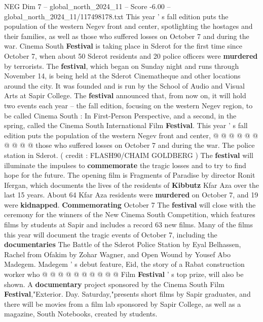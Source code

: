 \begin{textsample}{NEG Dim 7 – global\_north\_2024\_11 – Score -6.00 – global\_north\_2024\_11/117498178.txt}  \label{ex:f7_neg_257}
This year ' s fall edition puts the population of the western Negev front and center, spotlighting the hostages and their families, as well as those who suffered losses on October 7 and during the war.
Cinema South \textbf{Festival} is taking place in Sderot for the first time since October 7, when about 50 Sderot residents and 20 police officers were \textbf{murdered} by terrorists.
The \textbf{festival}, which began on Sunday night and runs through November 14, is being held at the Sderot Cinematheque and other locations around the city.
It was founded and is run by the School of Audio and Visual Arts at Sapir College.
The \textbf{festival} announced that, from now on, it will hold two events each year -- the fall edition, focusing on the western Negev region, to be called Cinema South : In First-Person Perspective, and a second, in the spring, called the Cinema South International Film \textbf{Festival}.
This year ' s fall edition puts the population of the western Negev front and center, @ @ @ @ @ @ @ @ @ @ those who suffered losses on October 7 and during the war.
The police station in Sderot. ( credit : FLASH90/CHAIM GOLDBERG ) The \textbf{festival} will illuminate the impulses to \textbf{commemorate} the tragic losses and to try to find hope for the future.
The opening film is Fragments of Paradise by director Ronit Ifergan, which documents the lives of the residents of \textbf{Kibbutz} Kfar Aza over the last 15 years.
About 64 Kfar Aza residents were \textbf{murdered} on October 7, and 19 were \textbf{kidnapped}. \textbf{Commemorating} October 7 The \textbf{festival} will close with the ceremony for the winners of the New Cinema South Competition, which features films by students at Sapir and includes a record 63 new films.
Many of the films this year will document the tragic events of October 7, including the \textbf{documentaries} The Battle of the Sderot Police Station by Eyal Belhassen, Rachel from Ofakim by Zohar Wagner, and Open Wound by Yousef Abo Madegem.
Madegem ' s debut feature, Eid, the story of a Rabat construction worker who @ @ @ @ @ @ @ @ @ @ Film \textbf{Festival} ' s top prize, will also be shown.
A \textbf{documentary} project sponsored by the Cinema South Film \textbf{Festival},"Exterior.
Day.
Saturday,"presents short films by Sapir graduates, and there will be movies from a film lab sponsored by Sapir College, as well as a magazine, South Notebooks, created by students.

\end{textsample}
